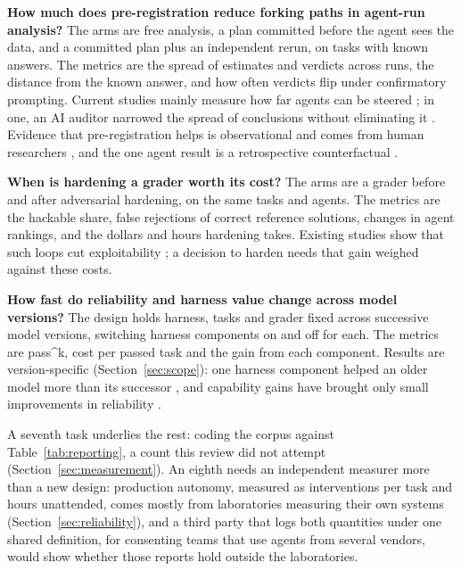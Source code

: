 \textbf{How much does pre-registration reduce forking paths in agent-run analysis?} The arms are free analysis, a plan committed before the agent sees the data, and a committed plan plus an independent rerun, on tasks with known answers. The metrics are the spread of estimates and verdicts across runs, the distance from the known answer, and how often verdicts flip under confirmatory prompting. Current studies mainly measure how far agents can be steered \citep{R2,R5}; in one, an AI auditor narrowed the spread of conclusions without eliminating it \citep{R1}. Evidence that pre-registration helps is observational and comes from human researchers \citep{R13,R19}, and the one agent result is a retrospective counterfactual \citep{R6}.

\textbf{When is hardening a grader worth its cost?} The arms are a grader before and after adversarial hardening, on the same tasks and agents. The metrics are the hackable share, false rejections of correct reference solutions, changes in agent rankings, and the dollars and hours hardening takes. Existing studies show that such loops cut exploitability \citep{V27,T24}; a decision to harden needs that gain weighed against these costs.

\textbf{How fast do reliability and harness value change across model versions?} The design holds harness, tasks and grader fixed across successive model versions, switching harness components on and off for each. The metrics are pass\textasciicircum k, cost per passed task and the gain from each component. Results are version-specific (Section~\ref{sec:scope}): one harness component helped an older model more than its successor \citep{H20}, and capability gains have brought only small improvements in reliability \citep{F2}.

A seventh task underlies the rest: coding the corpus against Table~\ref{tab:reporting}, a count this review did not attempt (Section~\ref{sec:measurement}). An eighth needs an independent measurer more than a new design: production autonomy, measured as interventions per task and hours unattended, comes mostly from laboratories measuring their own systems (Section~\ref{sec:reliability}), and a third party that logs both quantities under one shared definition, for consenting teams that use agents from several vendors, would show whether those reports hold outside the laboratories.
